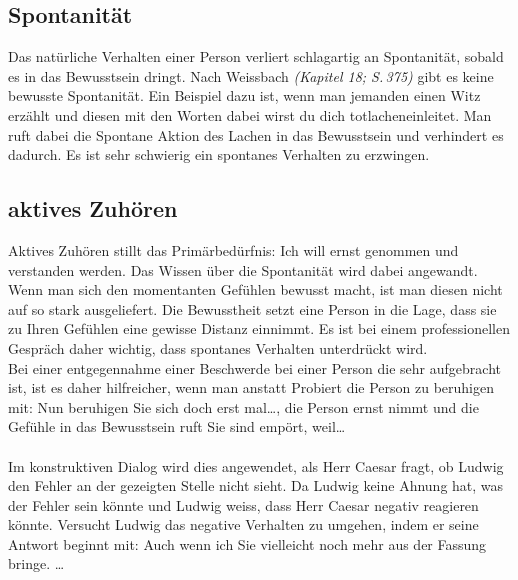 \subsection*{Spontanität}
Das natürliche Verhalten einer Person verliert schlagartig an Spontanität, sobald es in das Bewusstsein dringt. Nach Weissbach \textit{(Kapitel 18; S.\,375)} gibt es keine bewusste Spontanität. Ein Beispiel dazu ist, wenn man jemanden einen Witz erzählt und diesen mit den Worten \glqq dabei wirst du dich totlachen\grqq\text{ }einleitet. Man ruft dabei die Spontane Aktion des Lachen in das Bewusstsein und verhindert es dadurch. Es ist sehr schwierig ein spontanes Verhalten zu erzwingen.
\subsection*{aktives Zuhören}
Aktives Zuhören stillt das Primärbedürfnis: Ich will ernst genommen und verstanden werden. Das Wissen über die Spontanität wird dabei angewandt. Wenn man sich den momentanten Gefühlen bewusst macht, ist man diesen nicht auf so stark ausgeliefert. Die Bewusstheit setzt eine Person in die Lage, dass sie zu Ihren Gefühlen eine gewisse Distanz einnimmt. Es ist bei einem professionellen Gespräch daher wichtig, dass spontanes Verhalten unterdrückt wird.\\
Bei einer entgegennahme einer Beschwerde bei einer Person die sehr aufgebracht ist, ist es daher hilfreicher, wenn man anstatt Probiert die Person zu beruhigen mit: \glqq Nun beruhigen Sie sich doch erst mal\dots\grqq, die Person ernst nimmt und die Gefühle in das Bewusstsein ruft \glqq Sie sind empört, weil\dots\grqq\\
\\
Im konstruktiven Dialog wird dies angewendet, als Herr Caesar fragt, ob Ludwig den
Fehler an der gezeigten Stelle nicht sieht.  Da Ludwig keine Ahnung
hat, was der Fehler sein könnte und Ludwig weiss, dass Herr Caesar
negativ reagieren könnte.  Versucht Ludwig das negative Verhalten zu
umgehen, indem er seine Antwort beginnt mit:  \glqq Auch wenn ich Sie
vielleicht noch mehr aus der Fassung bringe. \dots\grqq

